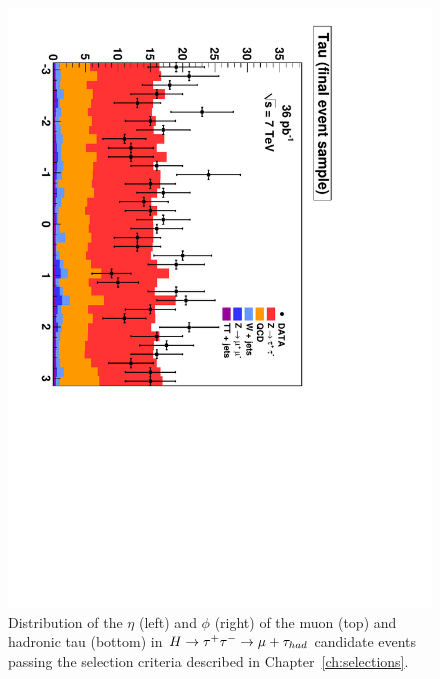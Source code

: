 \begin{figure}
\begin{center}
\includegraphics*[height=0.49\textwidth,angle=90]{results_chapter/figures/replotted_results/plotAHtoMuTauOS_inclusive_finalSamplePlots_tau_Phi_linear.pdf}
\caption[Distributions of the $\eta$ and $\phi$ of the muon and tau candidates in the final selected
events]{Distribution of the $\eta$ (left) and $\phi$ (right) of the muon (top) and hadronic
tau (bottom) in \mbox{$H \to \tau^+\tau^- \to \mu + \tau_{had}$} candidate events passing the
selection criteria described in Chapter~\ref{ch:selections}.}
\label{fig:FinalControlPlotsEtaPhi}
\end{center}
\end{figure} 
%
